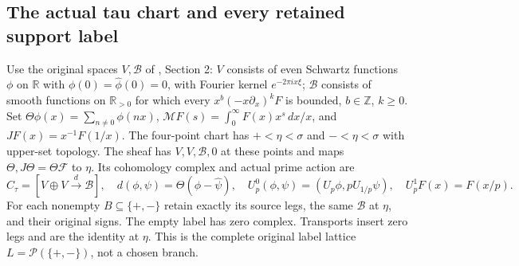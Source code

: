 \documentclass[11pt,a4paper]{article}
\theoremstyle{definition}\newtheorem{definition}[theorem]{Definition}
\begin{document}
\subsection{The actual tau chart and every retained support label}
Use the original spaces $V,\mathscr B$ of \cite{FJtau}, Section 2:
$V$ consists of even Schwartz functions $\phi$ on $\mathbb R$ with
$\phi(0)=\widehat\phi(0)=0$, with Fourier kernel $e^{-2\pi ix\xi}$;
$\mathscr B$ consists of smooth functions on $\mathbb R_{>0}$ for
which every $x^b(-x\partial_x)^kF$ is bounded, $b\in\mathbb Z$, $k\ge0$.
Set $\Theta\phi(x)=\sum_{n\ne0}\phi(nx)$,
$\mathcal MF(s)=\int_0^\infty F(x)x^s\,dx/x$, and
$J F(x)=x^{-1}F(1/x)$. The four-point chart has
$+<\eta<\sigma$ and $-<\eta<\sigma$ with upper-set topology.
The sheaf has $V,V,\mathscr B,0$ at these points and maps
$\Theta,J\Theta=\Theta\mathcal F$ to $\eta$.
Its cohomology complex and actual prime action are
\[
 C_\tau=[V\oplus V\xrightarrow{d}\mathscr B],\quad
 d(\phi,\psi)=\Theta(\phi-\widehat\psi),\quad
 U_p^0(\phi,\psi)=(U_p\phi,pU_{1/p}\psi),\quad
 U_p^1F(x)=F(x/p).
 \tag{FJ10}\label{fj:fj:tau}
\]
For each nonempty $B\subseteq\{+,-\}$ retain exactly its source
legs, the same $\mathscr B$ at $\eta$, and their original signs.
The empty label has zero complex. Transports insert zero legs and
are the identity at $\eta$. This is the complete original label
lattice $L=\mathcal P(\{+,-\})$, not a chosen branch.
\end{document}
